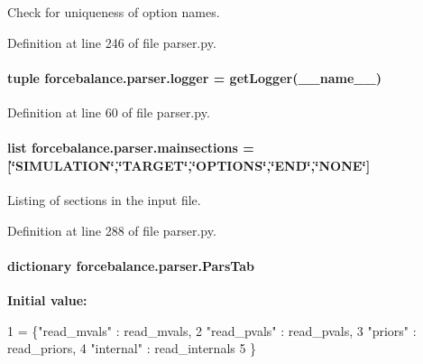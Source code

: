 Check for uniqueness of option names. 



Definition at line 246 of file parser.\-py.

\hypertarget{namespaceforcebalance_1_1parser_ab1a411e01f194a0a8fc51b5aaf4b05ac}{
\paragraph[{logger}]{\setlength{\rightskip}{0pt plus 5cm}tuple forcebalance.\-parser.\-logger = get\-Logger(\-\_\-\-\_\-name\-\_\-\-\_\-)}}\label{namespaceforcebalance_1_1parser_ab1a411e01f194a0a8fc51b5aaf4b05ac}


Definition at line 60 of file parser.\-py.

\hypertarget{namespaceforcebalance_1_1parser_a682a3870774181592a7a4784ab108ae6}{
\paragraph[{mainsections}]{\setlength{\rightskip}{0pt plus 5cm}list forcebalance.\-parser.\-mainsections = \mbox{[}\char`\"{}S\-I\-M\-U\-L\-A\-T\-I\-O\-N\char`\"{},\char`\"{}T\-A\-R\-G\-E\-T\char`\"{},\char`\"{}O\-P\-T\-I\-O\-N\-S\char`\"{},\char`\"{}E\-N\-D\char`\"{},\char`\"{}N\-O\-N\-E\char`\"{}\mbox{]}}}\label{namespaceforcebalance_1_1parser_a682a3870774181592a7a4784ab108ae6}


Listing of sections in the input file. 



Definition at line 288 of file parser.\-py.

\hypertarget{namespaceforcebalance_1_1parser_a492c80e361e80dc74aebc13e7a072dfb}{
\paragraph[{Pars\-Tab}]{\setlength{\rightskip}{0pt plus 5cm}dictionary forcebalance.\-parser.\-Pars\-Tab}}\label{namespaceforcebalance_1_1parser_a492c80e361e80dc74aebc13e7a072dfb}
{\bfseries Initial value\-:}
\begin{DoxyCode}
1 = \{\textcolor{stringliteral}{"read\_mvals"} : read\_mvals,
2             \textcolor{stringliteral}{"read\_pvals"} : read\_pvals,
3             \textcolor{stringliteral}{"priors"}     : read\_priors,
4             \textcolor{stringliteral}{"internal"}   : read\_internals
5             \}
\end{DoxyCode}


